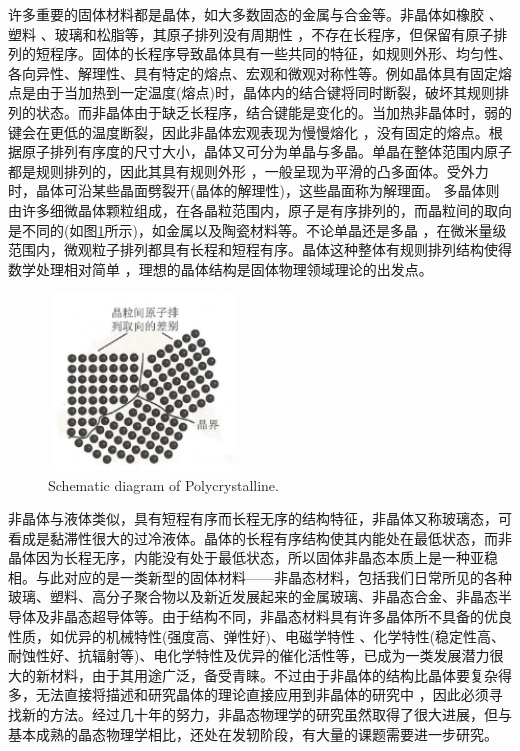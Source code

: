 许多重要的固体材料都是晶体，如大多数固态的金属与合金等。非晶体如橡胶 、塑料 、玻璃和松脂等，其原子排列没有周期性 ，不存在长程序，但保留有原子排列的短程序。固体的长程序导致晶体具有一些共同的特征，如规则外形、均匀性、各向异性、解理性、具有特定的熔点、宏观和微观对称性等。例如晶体具有固定熔点是由于当加热到一定温度(熔点)时，晶体内的结合键将同时断裂，破坏其规则排列的状态。而非晶体由于缺乏长程序，结合键能是变化的。当加热非晶体时，弱的键会在更低的温度断裂，因此非晶体宏观表现为慢慢熔化 ，没有固定的熔点。根据原子排列有序度的尺寸大小，晶体又可分为单晶与多晶。单晶在整体范围内原子都是规则排列的，因此其具有规则外形 ，一般呈现为平滑的凸多面体。受外力时，晶体可沿某些晶面劈裂开(晶体的解理性)，这些晶面称为解理面。%
多晶体则由许多细微晶体颗粒组成，在各晶粒范围内，原子是有序排列的，而晶粒间的取向是不同的(如图\ref{Fig:SSI-02}所示)，如金属以及陶瓷材料等。不论单晶还是多晶 ，在微米量级范围内，微观粒子排列都具有长程和短程有序。晶体这种整体有规则排列结构使得数学处理相对简单 ，理想的晶体结构是固体物理领域理论的出发点。
\begin{figure}[h!]
\centering
\vspace*{-0.18in}
\includegraphics[height=1.85in,width=2.0in,viewport=0 0 45 40,clip]{Figures/Polycrystal.png}
\caption{\small \textrm{Schematic diagram of Polycrystalline. }}%
\label{Fig:SSI-02}
\end{figure}

非晶体与液体类似，具有短程有序而长程无序的结构特征，非晶体又称玻璃态，可看成是黏滞性很大的过冷液体。晶体的长程有序结构使其内能处在最低状态，而非晶体因为长程无序，内能没有处于最低状态，所以固体非晶态本质上是一种亚稳相。与此对应的是一类新型的固体材料——非晶态材料，包括我们日常所见的各种玻璃、塑料、高分子聚合物以及新近发展起来的金属玻璃、非晶态合金、非晶态半导体及非晶态超导体等。由于结构不同，非晶态材料具有许多晶体所不具备的优良性质，如优异的机械特性(强度高、弹性好)、电磁学特性 、化学特性(稳定性高、耐蚀性好、抗辐射等)、电化学特性及优异的催化活性等，已成为一类发展潜力很大的新材料，由于其用途广泛，备受青睐。不过由于非晶体的结构比晶体要复杂得多，无法直接将描述和研究晶体的理论直接应用到非晶体的研究中 ，因此必须寻找新的方法。经过几十年的努力，非晶态物理学的研究虽然取得了很大进展，但与基本成熟的晶态物理学相比，还处在发轫阶段，有大量的课题需要进一步研究。

